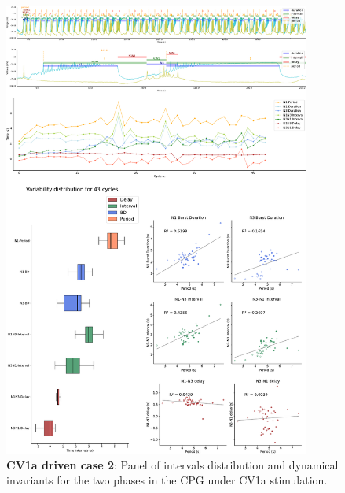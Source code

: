 

\begin{figure}[htbp]
	\centering
	\includegraphics[width=0.9\textwidth]{./img/invariants/data/SUSSEX/CV1a_driven2/images/panel_with_intervals.pdf}
	
	\caption{\textbf{CV1a driven case 2}: Panel of intervals distribution and dynamical invariants for the two phases in the CPG under CV1a stimulation.}
	\label{fig:cv1a 2 2phases}
\end{figure}



